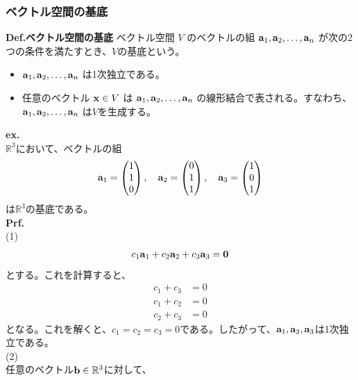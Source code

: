 \documentclass[a4paper,11pt]{jsarticle}
\numberwithin{equation}{section}
\begin{document}
\subsubsection{ベクトル空間の基底}
\begin{itembox}[l]{\textbf{Def.ベクトル空間の基底}}
  ベクトル空間 $V$ のベクトルの組 $\vb{a}_1, \vb{a}_2, \dots, \vb{a}_n$ が次の2つの条件を満たすとき、$V$の基底という。
  \begin{itemize}
    \item $\vb{a}_1, \vb{a}_2, \dots, \vb{a}_n$ は1次独立である。
    \item 任意のベクトル $\vb{x} \in V$ は $\vb{a}_1, \vb{a}_2, \dots, \vb{a}_n$ の線形結合で表される。すなわち、$\vb{a}_1, \vb{a}_2, \dots, \vb{a}_n$ は$V$を生成する。
  \end{itemize}
\end{itembox}
\textbf{ex.}\\
$\mathbb{R}^3$において、ベクトルの組
\begin{align}
  \vb{a}_1 = 
  \begin{pmatrix}
    1\\
    1\\
    0
  \end{pmatrix}
  ,\quad
  \vb{a}_2 =
  \begin{pmatrix}
    0\\
    1\\
    1
  \end{pmatrix}
  ,\quad
  \vb{a}_3 =
  \begin{pmatrix}
    1\\
    0\\
    1
  \end{pmatrix}
\end{align}
は$\mathbb{R}^3$の基底である。\\
\textbf{Prf.}\\
(1)\\
\begin{align}
  c_1\vb{a}_1 + c_2\vb{a}_2 + c_3\vb{a}_3 = \vb{0}
\end{align}
とする。これを計算すると、
\begin{align}
  c_1+c_3 &= 0\\
  c_1+c_2 &= 0\\
  c_2+c_3 &= 0
\end{align}
となる。これを解くと、$c_1=c_2=c_3=0$である。したがって、$\vb{a}_1, \vb{a}_2, \vb{a}_3$は1次独立である。\\
(2)\\
任意のベクトル$\vb{b} \in \mathbb{R}^3$に対して、
\end{document}
